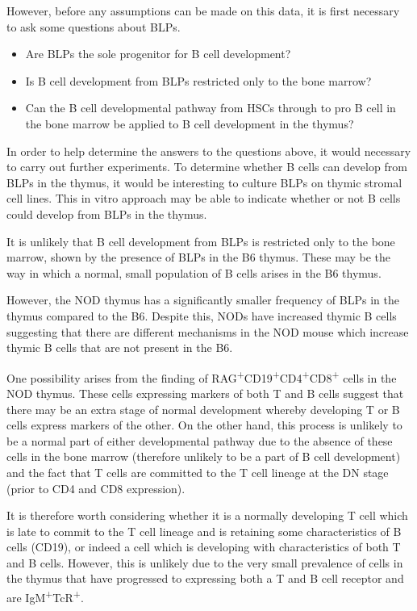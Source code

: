 However, before any assumptions can be made on this data, it is first necessary to ask some questions about BLPs.
\begin{itemize}
\item Are BLPs the sole progenitor for B cell development?
\item Is B cell development from BLPs restricted only to the bone marrow?
\item Can the B cell developmental pathway from HSCs through to pro B cell in the bone marrow be applied to B cell development in the thymus?
\end{itemize}

In order to help determine the answers to the questions above, it would necessary to carry out further experiments.
To determine whether B cells can develop from BLPs in the thymus, it would be interesting to culture BLPs on thymic stromal cell lines.
This in vitro approach may be able to indicate whether or not B cells could develop from BLPs in the thymus.

It is unlikely that B cell development from BLPs is restricted only to the bone marrow, shown by the presence of BLPs in the B6 thymus.
These may be the way in which a normal, small population of B cells arises in the B6 thymus.

However, the NOD thymus has a significantly smaller frequency of BLPs in the thymus compared to the B6.
Despite this, NODs have increased thymic B cells suggesting that there are different mechanisms in the NOD mouse which increase thymic B cells that are not present in the B6.

One possibility arises from the finding of RAG\textsuperscript{+}CD19\textsuperscript{+}CD4\textsuperscript{+}CD8\textsuperscript{+} cells in the NOD thymus.
These cells expressing markers of both T and B cells suggest that there may be an extra stage of normal development whereby developing T or B cells express markers of the other.
On the other hand, this process is unlikely to be a normal part of either developmental pathway due to the absence of these cells in the bone marrow (therefore unlikely to be a part of B cell development) and the fact that T cells are committed to the T cell lineage at the DN stage (prior to CD4 and CD8 expression).

It is therefore worth considering whether it is a normally developing T cell which is late to commit to the T cell lineage and is retaining some characteristics of B cells (CD19), or indeed a cell which is developing with characteristics of both T and B cells.
However, this is unlikely due to the very small prevalence of cells in the thymus that have progressed to expressing both a T and B cell receptor and are IgM\textsuperscript{+}TcR\textsuperscript{+}.

